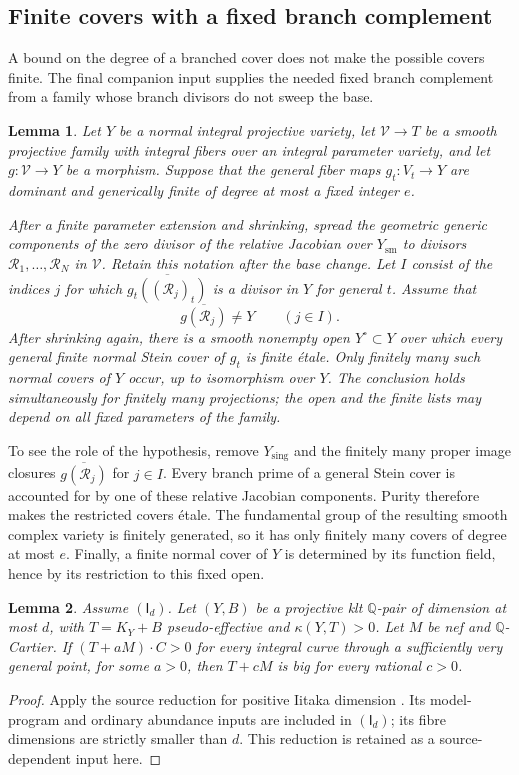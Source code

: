 \documentclass[12pt,a4paper,psamsfonts]{amsart}
\theoremstyle{definition}
\theoremstyle{plain}
\newtheorem{lemma}{Lemma}[section]
\newcommand{\Q}{\mathbb Q}
\begin{document}
\subsection{Finite covers with a fixed branch complement}

A bound on the degree of a branched cover does not make the
possible covers finite.  The final companion input supplies the
needed fixed branch complement from a family whose branch
divisors do not sweep the base.

\begin{lemma}
\label{j:finite-covers}
Let $Y$ be a normal integral projective variety, let
$\mathcal V\to T$ be a smooth projective family with integral
fibers over an integral parameter variety, and let
$g:\mathcal V\to Y$ be a morphism.  Suppose that the general
fiber maps $g_t:V_t\to Y$ are dominant and generically finite of
degree at most a fixed integer $e$.

After a finite parameter extension and shrinking, spread the
geometric generic components of the zero divisor of the relative
Jacobian over $Y_{\mathrm{sm}}$ to divisors
$\mathcal R_1,\ldots,\mathcal R_N$ in $\mathcal V$.
Retain this notation after the base change.  Let $I$ consist of
the indices $j$ for which
$\overline{g_t((\mathcal R_j)_t)}$ is a divisor in $Y$ for general
$t$.  Assume that
\[
 \overline{g(\mathcal R_j)}\ne Y\qquad(j\in I).
\]
After shrinking again, there is a smooth nonempty open
$Y^\circ\subset Y$ over which every general finite normal Stein
cover of $g_t$ is finite \'etale.  Only finitely many such normal
covers of $Y$ occur, up to isomorphism over $Y$.
The conclusion holds simultaneously for finitely many
projections; the open and the finite lists may depend on all
fixed parameters of the family.
\end{lemma}

To see the role of the hypothesis, remove $Y_{\mathrm{sing}}$
and the finitely many proper image closures
$\overline{g(\mathcal R_j)}$ for $j\in I$.  Every branch prime
of a general Stein cover is accounted for by one of these
relative Jacobian components.  Purity therefore makes the
restricted covers \'etale.  The fundamental group of the
resulting smooth complex variety is finitely generated, so it
has only finitely many covers of degree at most $e$.  Finally,
a finite normal cover of $Y$ is determined by its function
field, hence by its restriction to this fixed open.

\begin{lemma}\label{prop:full-positive}
Assume $(\mathsf I_d)$. Let $(Y,B)$ be a projective klt $\Q$-pair
of dimension at most $d$, with $T=K_Y+B$ pseudo-effective and
$\kappa(Y,T)>0$. Let $M$ be nef and $\mathbb{Q}$-Cartier. If
$(T+aM)\cdot C>0$ for every integral curve through a sufficiently
very general point, for some $a>0$, then $T+cM$ is big for every
rational $c>0$.
\end{lemma}
\begin{proof}
Apply the source reduction for positive Iitaka dimension
\cite[Proposition~3.3]{NS}. Its model-program and ordinary abundance
inputs are included in $(\mathsf I_d)$; its fibre dimensions are
strictly smaller than $d$. This reduction is retained as a
source-dependent input here.
\end{proof}
\end{document}
